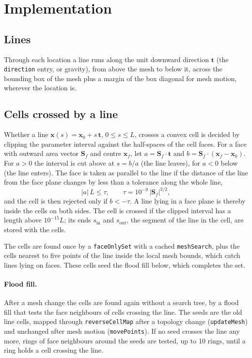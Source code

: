 \documentclass[11pt,a4paper]{article}
\begin{document}
\section{Implementation}

\subsection{Lines}
Through each location a line runs along the unit downward direction
$\mathbf{t}$ (the \texttt{direction} entry, or gravity), from above the mesh to
below it, across the bounding box of the mesh plus a margin of the box
diagonal for mesh motion, wherever the location is.

\subsection{Cells crossed by a line}
Whether a line $\mathbf{x}(s) = \mathbf{x}_0 + s\,\mathbf{t}$,
$0 \le s \le L$, crosses a convex cell is decided by clipping the parameter
interval against the half-spaces of the cell faces. For a face with outward
area vector $\mathbf{S}_f$ and centre $\mathbf{x}_f$, let
$a = \mathbf{S}_f\cdot\mathbf{t}$ and
$b = \mathbf{S}_f\cdot(\mathbf{x}_f - \mathbf{x}_0)$. For $a > 0$ the
interval is cut above at $s = b/a$ (the line leaves), for $a < 0$ below (the
line enters). The face is taken as parallel to the line if the distance of the
line from the face plane changes by less than a tolerance along the whole
line,
\begin{equation}
  |a|\,L \le \tau, \qquad \tau = 10^{-9}\,|\mathbf{S}_f|^{3/2},
  \label{eq:parallel}
\end{equation}
and the cell is then rejected only if $b < -\tau$. A line lying in a face
plane is thereby inside the cells on both sides. The cell is crossed if the
clipped interval has a length above $10^{-15}L$; its ends $s_\mathrm{in}$ and
$s_\mathrm{out}$, the segment of the line in the cell, are stored with the
cells.

The cells are found once by a \texttt{faceOnlySet} with a cached
\texttt{meshSearch}, plus the cells nearest to five points of the line inside
the local mesh bounds, which catch lines lying on faces. These cells seed the
flood fill below, which completes the set.

\paragraph{Flood fill.}
After a mesh change the cells are found again without a search tree, by a
flood fill that tests the face neighbours of cells crossing the line. The
seeds are the old line cells, mapped through \texttt{reverseCellMap} after a
topology change (\texttt{updateMesh}) and unchanged after mesh motion
(\texttt{movePoints}). If no seed crosses the line any more, rings of face
neighbours around the seeds are tested, up to 10 rings, until a ring holds a
cell crossing the line.
\end{document}

